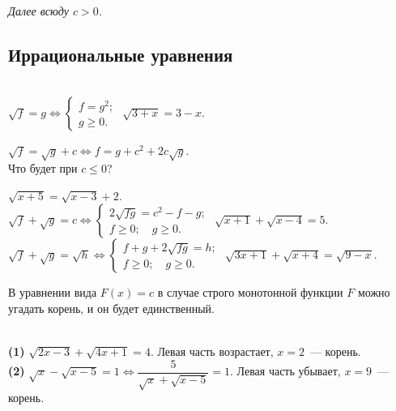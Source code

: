 

\emph{Далее всюду $c > 0$.}
\vspace{-2.5ex}

\subsection*{Иррациональные уравнения}

\begin{tabbing}
\hspace{20em}\=\\[-4ex]
\(
    \sqrt{f} = g
\Leftrightarrow
    \begin{cases}
        f = g^2
    ;\\
        g \geq 0
    .\end{cases}
\)
\>
\problem
$\sqrt{3 + x} = 3 - x$.
\\[2ex]%
\begin{minipage}{20em}
\(
    \sqrt{f} = \sqrt{g} + c
\Leftrightarrow
    f = g + c^2 + 2 c \sqrt{g}
\).
\\[0.5ex]
Что будет при $c \leq 0$?
\end{minipage}
\>
\problem
$\sqrt{x + 5} = \sqrt{x - 3} + 2$.
\\[2ex]%
\(
    \sqrt{f} + \sqrt{g} = c
\Leftrightarrow
    \begin{cases}
        2 \sqrt{fg} = c^2 - f - g
    ;\\
        f \geq 0
    ;\quad
        g \geq 0
    .\end{cases}
\)
\>
\problem
$\sqrt{x + 1} + \sqrt{x - 4} = 5$.
\\[2ex]%
\(
    \sqrt{f} + \sqrt{g} = \sqrt{h}
\Leftrightarrow
    \begin{cases}
        f + g + 2 \sqrt{fg} = h
    ;\\
        f \geq 0
    ;\quad
        g \geq 0
    .\end{cases}
\)
\>
\problem
$\sqrt{3 x + 1} + \sqrt{x + 4} = \sqrt{9 - x}$.
\end{tabbing}

В уравнении вида $F(x) = c$ в случае строго монотонной функции $F$ можно угадать
корень, и он будет единственный.

\example
\\[0.5ex]
\textbf{(1)}
\(
    \sqrt{2 x - 3} + \sqrt{4 x + 1} = 4
\).
Левая часть возрастает, $x = 2$~--- корень.
\\[1ex]
\textbf{(2)}
\(
    \sqrt{x} - \sqrt{x - 5} = 1
\Leftrightarrow
    \dfrac{5}{\sqrt{x} + \sqrt{x - 5}} = 1
\).
Левая часть убывает, $x = 9$~--- корень.


